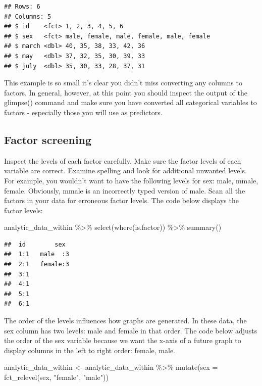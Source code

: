 \documentclass[
]{krantz}
\makeatletter
\newenvironment{Shaded}{\begin{snugshade}}{\end{snugshade}}
\newcommand{\AttributeTok}[1]{\textcolor[rgb]{0.61,0.61,0.61}{#1}}
\newcommand{\FunctionTok}[1]{\textcolor[rgb]{0,0,0}{#1}}
\newcommand{\NormalTok}[1]{#1}
\newcommand{\OtherTok}[1]{\textcolor[rgb]{0.37,0.37,0.37}{#1}}
\newcommand{\SpecialCharTok}[1]{\textcolor[rgb]{0,0,0}{#1}}
\newcommand{\StringTok}[1]{\textcolor[rgb]{0.5,0.5,0.5}{#1}}
\newenvironment{kframe}{%
\medskip{}
\setlength{\fboxsep}{.8em}
 \def\at@end@of@kframe{}%
 \ifinner\ifhmode%
  \def\at@end@of@kframe{\end{minipage}}%
  \begin{minipage}{\columnwidth}%
 \fi\fi%
 \def\FrameCommand##1{\hskip\@totalleftmargin \hskip-\fboxsep
 \colorbox{shadecolor}{##1}\hskip-\fboxsep
     \hskip-\linewidth \hskip-\@totalleftmargin \hskip\columnwidth}%
 \MakeFramed {\advance\hsize-\width
   \@totalleftmargin\z@ \linewidth\hsize
   \@setminipage}}%
 {\par\unskip\endMakeFramed%
 \at@end@of@kframe}
\renewenvironment{Shaded}{\begin{kframe}}{\end{kframe}}
\makeatother
\begin{document}
\begin{verbatim}
## Rows: 6
## Columns: 5
## $ id    <fct> 1, 2, 3, 4, 5, 6
## $ sex   <fct> male, female, male, female, male, female
## $ march <dbl> 40, 35, 38, 33, 42, 36
## $ may   <dbl> 37, 32, 35, 30, 39, 33
## $ july  <dbl> 35, 30, 33, 28, 37, 31
\end{verbatim}

This example is so small it's clear you didn't miss converting any columns to factors. In general, however, at this point you should inspect the output of the glimpse() command and make sure you have converted all categorical variables to factors - especially those you will use as predictors.

\hypertarget{factor-screening-1}{%
\subsection{Factor screening}\label{factor-screening-1}}

Inspect the levels of each factor carefully. Make sure the factor levels of each variable are correct. Examine spelling and look for additional unwanted levels. For example, you wouldn't want to have the following levels for sex: male, mmale, female. Obviously, mmale is an incorrectly typed version of male. Scan all the factors in your data for erroneous factor levels. The code below displays the factor levels:

\begin{Shaded}
\begin{Highlighting}[]
\NormalTok{analytic\_data\_within }\SpecialCharTok{\%\textgreater{}\%}
  \FunctionTok{select}\NormalTok{(}\FunctionTok{where}\NormalTok{(is.factor)) }\SpecialCharTok{\%\textgreater{}\%}
  \FunctionTok{summary}\NormalTok{()}
\end{Highlighting}
\end{Shaded}

\begin{verbatim}
##  id        sex   
##  1:1   male  :3  
##  2:1   female:3  
##  3:1             
##  4:1             
##  5:1             
##  6:1
\end{verbatim}

The order of the levels influences how graphs are generated. In these data, the sex column has two levels: male and female in that order. The code below adjusts the order of the sex variable because we want the x-axis of a future graph to display columns in the left to right order: female, male.

\begin{Shaded}
\begin{Highlighting}[]
\NormalTok{analytic\_data\_within }\OtherTok{\textless{}{-}}\NormalTok{ analytic\_data\_within }\SpecialCharTok{\%\textgreater{}\%}
  \FunctionTok{mutate}\NormalTok{(}\AttributeTok{sex =} \FunctionTok{fct\_relevel}\NormalTok{(sex,}
                           \StringTok{"female"}\NormalTok{,}
                           \StringTok{"male"}\NormalTok{))}
\end{Highlighting}
\end{Shaded}
\end{document}
